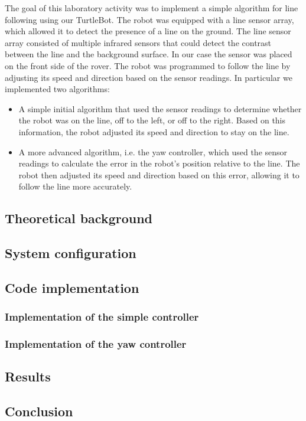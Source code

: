 The goal of this laboratory activity was to implement a simple algorithm for line following using our TurtleBot. The robot was equipped with a line sensor array, which allowed it to detect the presence of a line on the ground.
The line sensor array consisted of multiple infrared sensors that could detect the contrast between the line and the background surface. In our case the sensor was placed on the front side of the rover. 
The robot was programmed to follow the line by adjusting its speed and direction based on the sensor readings. 
In particular we implemented two algorithms: 
\begin{itemize}
    \item A simple initial algorithm that used the sensor readings to determine whether the robot was on the line, off to the left, or off to the right. Based on this information, the robot adjusted its speed and direction to stay on the line.
    \item A more advanced algorithm, i.e. the yaw controller, which used the sensor readings to calculate the error in the robot's position relative to the line. The robot then adjusted its speed and direction based on this error, allowing it to follow the line more accurately.
\end{itemize}

\subsection{Theoretical background}


\subsection{System configuration}


\subsection{Code implementation}
\subsubsection{Implementation of the simple controller}

\subsubsection{Implementation of the yaw controller}


\subsection{Results}


\subsection{Conclusion}
